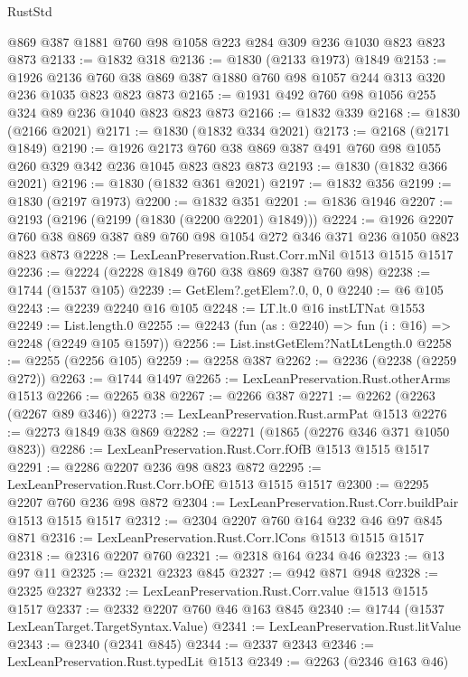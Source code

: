 \begin{lexlean}{RustStd}
\begin{coremodule}
    @869
    @387
    @1881
    @760
    @98
    @1058
    @223
    @284
    @309
    @236
    @1030
    @823
    @823
    @873
@2133 := @1832 @318
@2136 := @1830 (@2133 @1973) @1849
@2153 := @1926
    @2136
    @760
    @38
    @869
    @387
    @1880
    @760
    @98
    @1057
    @244
    @313
    @320
    @236
    @1035
    @823
    @823
    @873
@2165 := @1931 @492 @760 @98 @1056 @255 @324 @89 @236 @1040 @823 @823 @873
@2166 := @1832 @339
@2168 := @1830 (@2166 @2021)
@2171 := @1830 (@1832 @334 @2021)
@2173 := @2168 (@2171 @1849)
@2190 := @1926 @2173 @760 @38 @869 @387 @491 @760 @98 @1055 @260 @329 @342 @236 @1045 @823 @823 @873
@2193 := @1830 (@1832 @366 @2021)
@2196 := @1830 (@1832 @361 @2021)
@2197 := @1832 @356
@2199 := @1830 (@2197 @1973)
@2200 := @1832 @351
@2201 := @1836 @1946
@2207 := @2193 (@2196 (@2199 (@1830 (@2200 @2201) @1849)))
@2224 := @1926 @2207 @760 @38 @869 @387 @89 @760 @98 @1054 @272 @346 @371 @236 @1050 @823 @823 @873
@2228 := LexLeanPreservation.Rust.Corr.mNil @1513 @1515 @1517
@2236 := @2224 (@2228 @1849 @760 @38 @869 @387 @760 @98)
@2238 := @1744 (@1537 @105)
@2239 := GetElem?.getElem?.{0, 0, 0}
@2240 := @6 @105
@2243 := @2239 @2240 @16 @105
@2248 := LT.lt.{0} @16 instLTNat @1553
@2249 := List.length.{0}
@2255 := @2243 (fun (as : @2240) => fun (i : @16) => @2248 (@2249 @105 @1597))
@2256 := List.instGetElem?NatLtLength.{0}
@2258 := @2255 (@2256 @105)
@2259 := @2258 @387
@2262 := @2236 (@2238 (@2259 @272))
@2263 := @1744 @1497
@2265 := LexLeanPreservation.Rust.otherArms @1513
@2266 := @2265 @38
@2267 := @2266 @387
@2271 := @2262 (@2263 (@2267 @89 @346))
@2273 := LexLeanPreservation.Rust.armPat @1513
@2276 := @2273 @1849 @38 @869
@2282 := @2271 (@1865 (@2276 @346 @371 @1050 @823))
@2286 := LexLeanPreservation.Rust.Corr.fOfB @1513 @1515 @1517
@2291 := @2286 @2207 @236 @98 @823 @872
@2295 := LexLeanPreservation.Rust.Corr.bOfE @1513 @1515 @1517
@2300 := @2295 @2207 @760 @236 @98 @872
@2304 := LexLeanPreservation.Rust.Corr.buildPair @1513 @1515 @1517
@2312 := @2304 @2207 @760 @164 @232 @46 @97 @845 @871
@2316 := LexLeanPreservation.Rust.Corr.lCons @1513 @1515 @1517
@2318 := @2316 @2207 @760
@2321 := @2318 @164 @234 @46
@2323 := @13 @97 @11
@2325 := @2321 @2323 @845
@2327 := @942 @871 @948
@2328 := @2325 @2327
@2332 := LexLeanPreservation.Rust.Corr.value @1513 @1515 @1517
@2337 := @2332 @2207 @760 @46 @163 @845
@2340 := @1744 (@1537 LexLeanTarget.TargetSyntax.Value)
@2341 := LexLeanPreservation.Rust.litValue
@2343 := @2340 (@2341 @845)
@2344 := @2337 @2343
@2346 := LexLeanPreservation.Rust.typedLit @1513
@2349 := @2263 (@2346 @163 @46)

\end{coremodule}
\end{lexlean}
